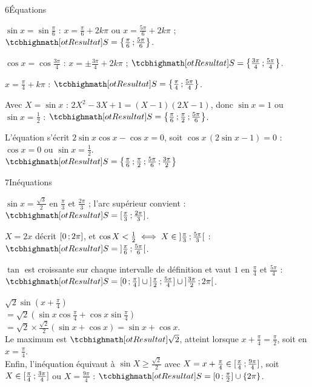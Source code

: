\begin{deuxcolonnes}
\begin{corrige}{6}{Équations}
\begin{questions}
  \item $\sin x=\sin\frac{\pi}{6}$ : $x=\frac{\pi}{6}+2k\pi$ ou $x=\frac{5\pi}{6}+2k\pi$ ; $\res{S=\ens{\frac{\pi}{6}\pv\frac{5\pi}{6}}}$.
  \item $\cos x=\cos\frac{3\pi}{4}$ : $x=\pm\frac{3\pi}{4}+2k\pi$ ; $\res{S=\ens{\frac{3\pi}{4}\pv\frac{5\pi}{4}}}$.
  \item $x=\frac{\pi}{4}+k\pi$ : $\res{S=\ens{\frac{\pi}{4}\pv\frac{5\pi}{4}}}$.
  \item Avec $X=\sin x$ : $2X^{2}-3X+1=(X-1)(2X-1)$, donc $\sin x=1$ ou $\sin x=\frac12$ : $\res{S=\ens{\frac{\pi}{6}\pv\frac{\pi}{2}\pv\frac{5\pi}{6}}}$.
  \item L'équation s'écrit $2\sin x\cos x-\cos x=0$, soit $\cos x\,(2\sin x-1)=0$ : $\cos x=0$ ou $\sin x=\frac12$.\\
    $\res{S=\ens{\frac{\pi}{6}\pv\frac{\pi}{2}\pv\frac{5\pi}{6}\pv\frac{3\pi}{2}}}$
\end{questions}
\end{corrige}

\begin{corrige}{7}{Inéquations}
\begin{questions}
  \item $\sin x=\frac{\sqrt3}{2}$ en $\frac{\pi}{3}$ et $\frac{2\pi}{3}$ ; l'arc supérieur convient : $\res{S=\intFF{\frac{\pi}{3}}{\frac{2\pi}{3}}}$.
  \item $X=2x$ décrit $\mathopen{[}0\,{;}\,2\pi\mathclose{]}$, et $\cos X<\frac12\iff X\in\mathopen{]}\frac{\pi}{3}\,{;}\,\frac{5\pi}{3}\mathclose{[}$ :
    $\res{S=\intOO{\frac{\pi}{6}}{\frac{5\pi}{6}}}$.
  \item $\tan$ est croissante sur chaque intervalle de définition et vaut $1$ en $\frac{\pi}{4}$ et $\frac{5\pi}{4}$ :
    $\res{S=\intFF{0}{\frac{\pi}{4}}\cup\intOF{\frac{\pi}{2}}{\frac{5\pi}{4}}\cup\intOO{\frac{3\pi}{2}}{2\pi}}$.
  \item $\sqrt2\sin\left(x+\frac{\pi}{4}\right)$\\
    $=\sqrt2\left(\sin x\cos\frac{\pi}{4}+\cos x\sin\frac{\pi}{4}\right)$\\
    $=\sqrt2\times\frac{\sqrt2}{2}(\sin x+\cos x)=\sin x+\cos x$.\\
    Le maximum est $\res{\sqrt2}$, atteint lorsque $x+\frac{\pi}{4}=\frac{\pi}{2}$, soit en $x=\frac{\pi}{4}$.\\
    Enfin, l'inéquation équivaut à $\sin X\geq\frac{\sqrt2}{2}$ avec $X=x+\frac{\pi}{4}\in\mathopen{[}\frac{\pi}{4}\,{;}\,\frac{9\pi}{4}\mathclose{]}$, soit
    $X\in\mathopen{[}\frac{\pi}{4}\,{;}\,\frac{3\pi}{4}\mathclose{]}$ ou $X=\frac{9\pi}{4}$ : $\res{S=\intFF{0}{\frac{\pi}{2}}\cup\ens{2\pi}}$.
\end{questions}
\end{corrige}


\end{deuxcolonnes}
